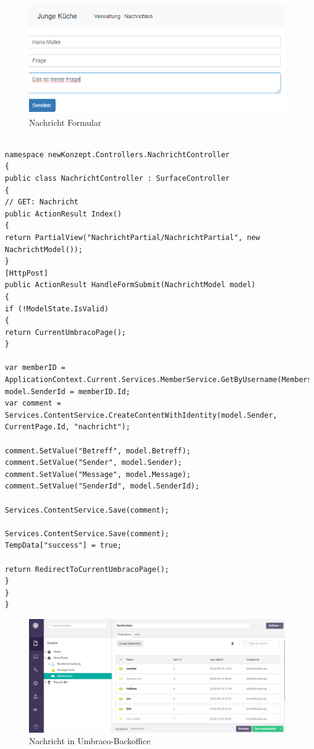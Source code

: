 \begin{figure}[h]
	\centering
	\includegraphics[width=0.7\linewidth]{Graphics/NachrichtNEU.png}
	\caption[Nachricht Formular]{Nachricht Formular}
	\label{fig:NachrichtNEU}
\end{figure}
\begin{lstlisting}[caption={NachrichController}, label=lst:NachrichController]

namespace newKonzept.Controllers.NachrichtController
{
public class NachrichtController : SurfaceController
{
// GET: Nachricht
public ActionResult Index()
{
return PartialView("NachrichtPartial/NachrichtPartial", new NachrichtModel());
}
[HttpPost]
public ActionResult HandleFormSubmit(NachrichtModel model)
{
if (!ModelState.IsValid)
{
return CurrentUmbracoPage();
}

var memberID = ApplicationContext.Current.Services.MemberService.GetByUsername(Membership.GetUser().UserName);
model.SenderId = memberID.Id;
var comment = Services.ContentService.CreateContentWithIdentity(model.Sender, CurrentPage.Id, "nachricht");

comment.SetValue("Betreff", model.Betreff);
comment.SetValue("Sender", model.Sender);
comment.SetValue("Message", model.Message);
comment.SetValue("SenderId", model.SenderId);

Services.ContentService.Save(comment);

Services.ContentService.Save(comment);
TempData["success"] = true;

return RedirectToCurrentUmbracoPage();
}
}
}
\end{lstlisting}


\begin{figure}[h]
	\centering
	\includegraphics[width=0.7\linewidth]{Graphics/NachrichtUmbraco.png}
	\caption[NachrichtUmbraco]{Nachricht in Umbraco-Backoffice}
	\label{fig:NachrichtUmbraco}
\end{figure}

